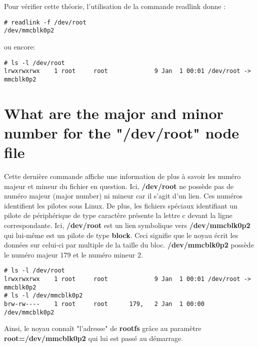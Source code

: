 Pour vérifier cette théorie, l'utilisation de la commande readlink donne :
\begin{lstlisting}
# readlink -f /dev/root
/dev/mmcblk0p2
\end{lstlisting}
ou encore:
\begin{lstlisting}
# ls -l /dev/root
lrwxrwxrwx    1 root     root             9 Jan  1 00:01 /dev/root -> mmcblk0p2
\end{lstlisting}

\section{What are the major and minor number for the "/dev/root" node file}
Cette dernière commande affiche une information de plus à savoir les numéro majeur et mineur du fichier en question. Ici, \textbf{/dev/root} ne possède pas de numéro majeur (major number) ni mineur car il s'agit d'un lien. Ces numéros identifient les pilotes sous Linux. De plus, les fichiers spéciaux identifiant un pilote de périphérique de type caractère présente la lettre c devant la ligne correspondante. Ici, \textbf{/dev/root} est un lien symbolique vers \textbf{/dev/mmcblk0p2} qui lui-même est un pilote de type \textbf{block}. Ceci signifie que le noyau écrit les données sur celui-ci par multiple de la taille du bloc. \textbf{/dev/mmcblk0p2} possède le numéro majeur 179 et le numéro mineur 2.
\begin{lstlisting}[style=Bash]
# ls -l /dev/root
lrwxrwxrwx    1 root     root             9 Jan  1 00:01 /dev/root -> mmcblk0p2
# ls -l /dev/mmcblk0p2
brw-rw----    1 root     root      179,   2 Jan  1 00:00 /dev/mmcblk0p2
\end{lstlisting}

Ainsi, le noyau connaît "l'adresse" de \textbf{rootfs} grâce au paramètre \textbf{root=/dev/mmcblk0p2} qui lui est passé au démarrage.
